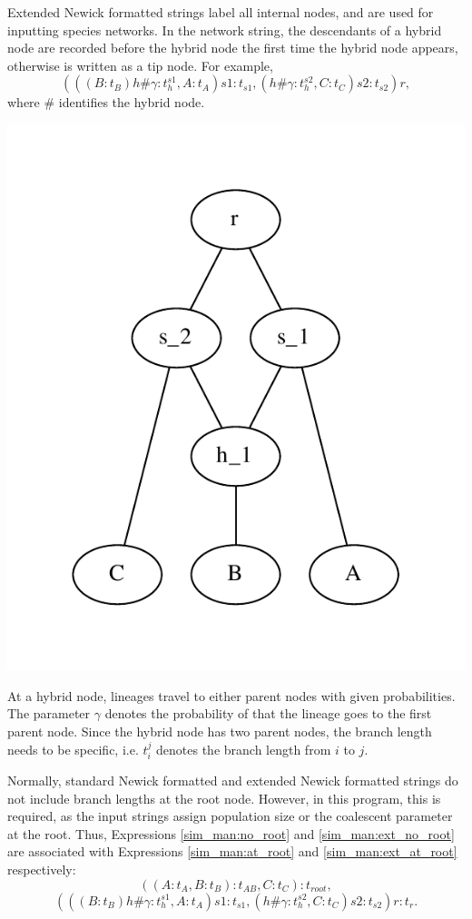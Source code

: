 Extended Newick formatted strings \citep{Cardona12008,Huson2010} label all internal
nodes, and are used for inputting species networks. In the network string, the descendants of a hybrid node are recorded before the hybrid node the first time the hybrid node appears, otherwise is written as a tip node. For example,
\begin{equation}
(((B:t_B)h\#\gamma:t^{s1}_{h},A:t_A)s1:t_{s1},(h\#\gamma:t^{s2}_{h},C:t_{C})s2:t_{s2})r,\label{sim_man:ext_no_root}
\end{equation}
where $\#$ identifies the hybrid node.
\begin{center}
\includegraphics[width=.5\textwidth]{net_eg.pdf}
\end{center}
At a hybrid node, lineages travel to either parent nodes with given probabilities. The parameter $\gamma$ denotes the probability of that the lineage goes to the first parent node.
Since the hybrid node has two parent nodes, the branch length needs to be specific, i.e. $t_{i}^j$ denotes the branch length from $i$ to $j$.

Normally, standard Newick formatted and extended Newick formatted strings do not include branch lengths at the root node. However, in this program, this is required, as the input strings assign population size or the coalescent parameter at the root. Thus, Expressions \eqref{sim_man:no_root} and \eqref{sim_man:ext_no_root} are associated with Expressions \eqref{sim_man:at_root} and \eqref{sim_man:ext_at_root} respectively:
\begin{equation}
((A:t_A,B:t_B):t_{AB},C:t_C):t_{root}\label{sim_man:at_root},
\end{equation}
\begin{equation}
(((B:t_B)h\#\gamma:t^{s1}_{h},A:t_A)s1:t_{s1},(h\#\gamma:t^{s2}_{h},C:t_{C})s2:t_{s2})r:t_r.\label{sim_man:ext_at_root}
\end{equation}




